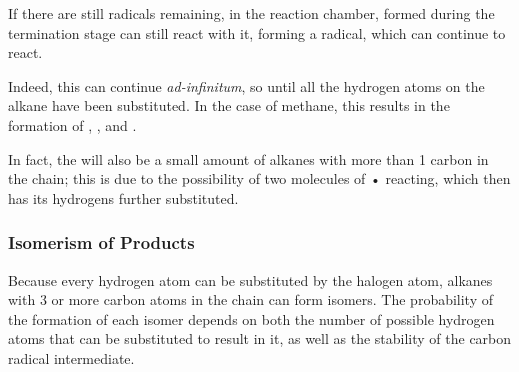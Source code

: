 				If there are still \ch{\Cl} radicals remaining, in the reaction chamber,  formed during the
				termination stage can still react with it, forming a  radical, which can continue to react.


				Indeed, this can continue \textit{ad-infinitum}, so until all the hydrogen atoms on the alkane have been substituted.
				In the case of methane, this results in the formation of , ,  and
				.

				In fact, the will also be a small amount of alkanes with more than 1 carbon in the chain; this is due to the
				possibility of two molecules of • reacting, which then has its hydrogens further substituted.





			\pagebreak
			\subsubsection{Isomerism of Products}

				Because every hydrogen atom can be substituted by the halogen atom, alkanes with 3 or more carbon atoms in the chain
				can form isomers. The probability of the formation of each isomer depends on both the number of possible hydrogen atoms
				that can be substituted to result in it, as well as the stability of the carbon radical intermediate.


